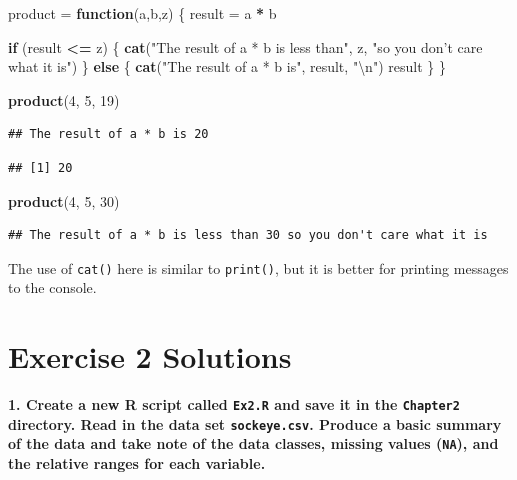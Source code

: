 \documentclass[]{book}
\newenvironment{Shaded}{\begin{snugshade}}{\end{snugshade}}
\newcommand{\CharTok}[1]{\textcolor[rgb]{0.31,0.60,0.02}{#1}}
\newcommand{\ControlFlowTok}[1]{\textcolor[rgb]{0.13,0.29,0.53}{\textbf{#1}}}
\newcommand{\DecValTok}[1]{\textcolor[rgb]{0.00,0.00,0.81}{#1}}
\newcommand{\KeywordTok}[1]{\textcolor[rgb]{0.13,0.29,0.53}{\textbf{#1}}}
\newcommand{\NormalTok}[1]{#1}
\newcommand{\OperatorTok}[1]{\textcolor[rgb]{0.81,0.36,0.00}{\textbf{#1}}}
\newcommand{\StringTok}[1]{\textcolor[rgb]{0.31,0.60,0.02}{#1}}
\begin{document}
\begin{Shaded}
\begin{Highlighting}[]
\NormalTok{product =}\StringTok{ }\ControlFlowTok{function}\NormalTok{(a,b,z) \{}
\NormalTok{  result =}\StringTok{ }\NormalTok{a }\OperatorTok{*}\StringTok{ }\NormalTok{b}
  
  \ControlFlowTok{if}\NormalTok{ (result }\OperatorTok{<=}\StringTok{ }\NormalTok{z) \{}
    \KeywordTok{cat}\NormalTok{(}\StringTok{"The result of a * b is less than"}\NormalTok{, z, }\StringTok{"so you don't care what it is"}\NormalTok{)}
\NormalTok{  \} }\ControlFlowTok{else}\NormalTok{ \{}
    \KeywordTok{cat}\NormalTok{(}\StringTok{"The result of a * b is"}\NormalTok{, result, }\StringTok{"}\CharTok{\textbackslash{}n}\StringTok{"}\NormalTok{)}
\NormalTok{    result}
\NormalTok{  \}}
\NormalTok{\}}

\KeywordTok{product}\NormalTok{(}\DecValTok{4}\NormalTok{, }\DecValTok{5}\NormalTok{, }\DecValTok{19}\NormalTok{)}
\end{Highlighting}
\end{Shaded}

\begin{verbatim}
## The result of a * b is 20
\end{verbatim}

\begin{verbatim}
## [1] 20
\end{verbatim}

\begin{Shaded}
\begin{Highlighting}[]
\KeywordTok{product}\NormalTok{(}\DecValTok{4}\NormalTok{, }\DecValTok{5}\NormalTok{, }\DecValTok{30}\NormalTok{)}
\end{Highlighting}
\end{Shaded}

\begin{verbatim}
## The result of a * b is less than 30 so you don't care what it is
\end{verbatim}

The use of \texttt{cat()} here is similar to \texttt{print()}, but it is better for printing messages to the console.

\hypertarget{ex2-answers}{%
\section*{Exercise 2 Solutions}\label{ex2-answers}}

\textbf{1. Create a new R script called \texttt{Ex2.R} and save it in the \texttt{Chapter2} directory. Read in the data set \texttt{sockeye.csv}. Produce a basic summary of the data and take note of the data classes, missing values (\texttt{NA}), and the relative ranges for each variable.}
\end{document}
